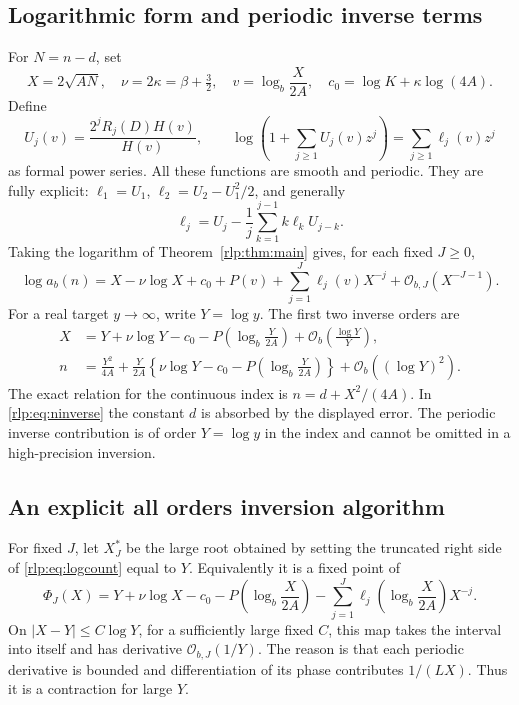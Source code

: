 \documentclass[11pt,letterpaper]{article}
\numberwithin{equation}{section}
\theoremstyle{remark}\newtheorem{remark}[theorem]{Remark}
\newcommand{\Ord}{\mathcal O}
\begin{document}
\subsection{Logarithmic form and periodic inverse terms}
For $N=n-d$, set
\begin{equation}\label{rlp:eq:inversevars}
 X=2\sqrt{AN},\quad \nu=2\kappa=\beta+\tfrac32,\quad
 v=\log_b\frac{X}{2A},\quad c_0=\log K+\kappa\log(4A).
\end{equation}
Define
\begin{equation}\label{rlp:eq:Uell}
 U_j(v)=\frac{2^jR_j(D)H(v)}{H(v)},\qquad
 \log\left(1+\sum_{j\ge1}U_j(v)z^j\right)
 =\sum_{j\ge1}\ell_j(v)z^j
\end{equation}
as formal power series. All these functions are smooth and periodic. They are fully explicit: $\ell_1=U_1$, $\ell_2=U_2-U_1^2/2$, and generally
\begin{equation}\label{rlp:eq:ellrecurrence}
 \ell_j=U_j-\frac1j\sum_{k=1}^{j-1}k\ell_kU_{j-k}.
\end{equation}
Taking the logarithm of Theorem~\ref{rlp:thm:main} gives, for each fixed $J\ge0$,
\begin{equation}\label{rlp:eq:logcount}
 \log a_b(n)=X-\nu\log X+c_0+P(v)
     +\sum_{j=1}^J\ell_j(v)X^{-j}
     +\Ord_{b,J}(X^{-J-1}).
\end{equation}
For a real target $y\to\infty$, write $Y=\log y$. The first two inverse orders are
\begin{align}
 X&=Y+\nu\log Y-c_0-P\left(\log_b\frac{Y}{2A}\right)
        +\Ord_b\left(\frac{\log Y}{Y}\right),\label{rlp:eq:Xinverse}\\
 n&=\frac{Y^2}{4A}+
 \frac{Y}{2A}\left\{\nu\log Y-c_0-P\left(\log_b\frac{Y}{2A}\right)\right\}
 +\Ord_b((\log Y)^2).\label{rlp:eq:ninverse}
\end{align}
The exact relation for the continuous index is $n=d+X^2/(4A)$. In \eqref{rlp:eq:ninverse} the constant $d$ is absorbed by the displayed error. The periodic inverse contribution is of order $Y=\log y$ in the index and cannot be omitted in a high-precision inversion.

\subsection{An explicit all orders inversion algorithm}
For fixed $J$, let $X_J^*$ be the large root obtained by setting the truncated right side of \eqref{rlp:eq:logcount} equal to $Y$. Equivalently it is a fixed point of
\begin{equation}\label{rlp:eq:fixedpoint}
 \Phi_J(X)=Y+\nu\log X-c_0-P\left(\log_b\frac X{2A}\right)
 -\sum_{j=1}^J\ell_j\left(\log_b\frac X{2A}\right)X^{-j}.
\end{equation}
On $|X-Y|\le C\log Y$, for a sufficiently large fixed $C$, this map takes the interval into itself and has derivative $\Ord_{b,J}(1/Y)$. The reason is that each periodic derivative is bounded and differentiation of its phase contributes $1/(LX)$. Thus it is a contraction for large $Y$.
\end{document}
